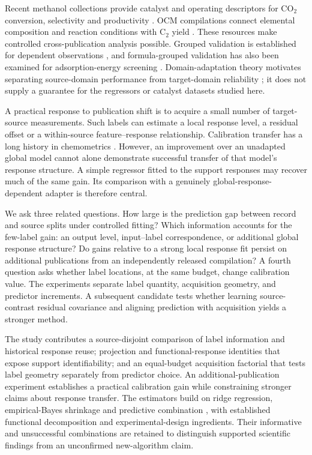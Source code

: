 \documentclass[11pt]{article}
\begin{document}
Recent methanol collections provide catalyst and operating descriptors for CO$_2$ conversion, selectivity and productivity \cite{toldy,yan,suvarna}. OCM compilations connect elemental composition and reaction conditions with C$_2$ yield \cite{schmack,mine}. These resources make controlled cross-publication analysis possible. Grouped validation is established for dependent observations \cite{roberts}, and formula-grouped validation has also been examined for adsorption-energy screening \cite{wu}. Domain-adaptation theory motivates separating source-domain performance from target-domain reliability \cite{bendavid}; it does not supply a guarantee for the regressors or catalyst datasets studied here.

A practical response to publication shift is to acquire a small number of target-source measurements. Such labels can estimate a local response level, a residual offset or a within-source feature--response relationship. Calibration transfer has a long history in chemometrics \cite{feudale}. However, an improvement over an unadapted global model cannot alone demonstrate successful transfer of that model's response structure. A simple regressor fitted to the support responses may recover much of the same gain. Its comparison with a genuinely global-response-dependent adapter is therefore central.

We ask three related questions. How large is the prediction gap between record and source splits under controlled fitting? Which information accounts for the few-label gain: an output level, input--label correspondence, or additional global response structure? Do gains relative to a strong local response fit persist on additional publications from an independently released compilation? A fourth question asks whether label locations, at the same budget, change calibration value. The experiments separate label quantity, acquisition geometry, and predictor increments. A subsequent candidate tests whether learning source-contrast residual covariance and aligning prediction with acquisition yields a stronger method.

The study contributes a source-disjoint comparison of label information and historical response reuse; projection and functional-response identities that expose support identifiability; and an equal-budget acquisition factorial that tests label geometry separately from predictor choice. An additional-publication experiment establishes a practical calibration gain while constraining stronger claims about response transfer. The estimators build on ridge regression, empirical-Bayes shrinkage and predictive combination \cite{efron,breiman}, with established functional decomposition and experimental-design ingredients. Their informative and unsuccessful combinations are retained to distinguish supported scientific findings from an unconfirmed new-algorithm claim.
\end{document}
